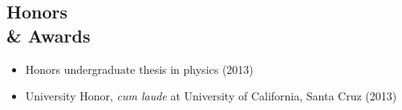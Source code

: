 \documentclass[margin,10pt]{res}
\begin{document}
\begin{resume}
                 
                                  
\section{Honors \\ \& Awards}
                 \begin{itemize}  \itemsep -1pt %
                    \item Honors undergraduate thesis in physics (2013)
                    \item University Honor, \textit{cum laude} at University of California, Santa Cruz (2013)\\
                 \end{itemize}  


\end{resume}
\end{document}
